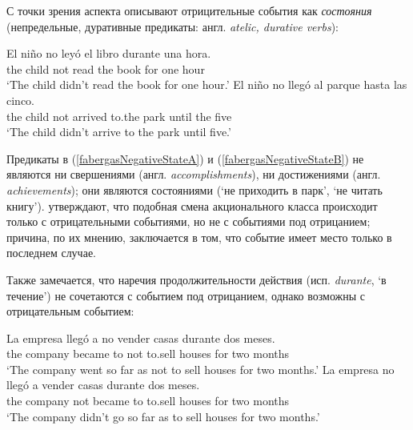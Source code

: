 \documentclass[a4paper, titlepage]{article}
\begin{document}
С точки зрения аспекта \citep{fabergas2017building} описывают отрицительные события как \textit{состояния} (непредельные, дуративные предикаты: англ. \textit{atelic, durative verbs}):

\begin{exe}
    \ex \label{fabergasNegativeState} \begin{xlist}
        \ex \label{fabergasNegativeStateA} 
            \gll El niño no leyó el libro durante una hora. \\
                 the child not read the book for one hour \\
            \glt `The child didn’t read the book for one hour.'
        \ex \label{fabergasNegativeStateB}
            \gll El niño no llegó al parque hasta las cinco. \\
                 the child not arrived to.the park until the five \\
            \glt `The child didn’t arrive to the park until five.'
    \end{xlist}
\end{exe}

Предикаты в (\ref{fabergasNegativeStateA}) и (\ref{fabergasNegativeStateB}) не являются ни свершениями (англ. \textit{accomplishments}), ни достижениями (англ. \textit{achievements}); они являются состояниями (`не приходить в парк', `не читать книгу'). \citep{fabergas2017building} утверждают, что подобная смена акционального класса происходит только с отрицательными событиями, но не с событиями под отрицанием; причина, по их мнению, заключается в том, что событие имеет место только в последнем случае.

\medskip

Также замечается, что наречия продолжительности действия (исп. \textit{durante}, `в течение') не сочетаются с событием под отрицанием, однако возможны с отрицательным событием:

\begin{exe}
    \ex \label{fabergasForPhrase} \begin{xlist}
        \ex \label{fabergasForPhrase} 
            \gll La empresa llegó a no vender casas durante dos meses. \\
                 the company became to not to.sell houses for two months \\
            \glt `The company went so far as not to sell houses for two months.'
        \ex \label{fabergasForPhraseBad}
            \gll *La empresa no llegó a vender casas durante dos meses. \\
                 the company not became to to.sell houses for two months \\
            \glt `The company didn’t go so far as to sell houses for two months.'
    \end{xlist}
\end{exe}
\end{document}
